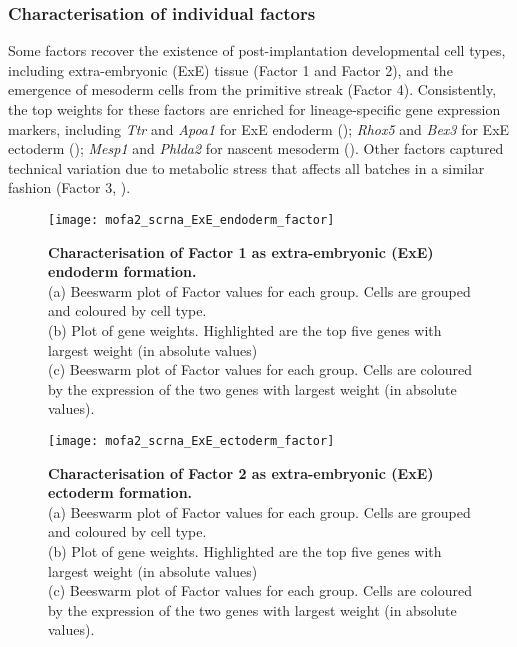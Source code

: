 \subsubsection{Characterisation of individual factors}

Some factors recover the existence of post-implantation developmental cell types, including extra-embryonic (ExE) tissue (Factor 1 and Factor 2), and the emergence of mesoderm cells from the primitive streak (Factor 4). Consistently, the top weights for these factors are enriched for lineage-specific gene expression markers, including \textit{Ttr} and \textit{Apoa1} for ExE endoderm (); \textit{Rhox5} and \textit{Bex3} for ExE ectoderm (); \textit{Mesp1} and \textit{Phlda2} for nascent mesoderm (). Other factors captured technical variation due to metabolic stress that affects all batches in a similar fashion (Factor 3, ).

\begin{figure}[H]
	\centering
	\texttt{[image: mofa2\_scrna\_ExE\_endoderm\_factor]}
	\caption[]{
	\textbf{Characterisation of Factor 1 as extra-embryonic (ExE) endoderm formation.} \\
	(a) Beeswarm plot of Factor values for each group. Cells are grouped and coloured by cell type. \\
	(b) Plot of gene weights. Highlighted are the top five genes with largest weight (in absolute values) \\
	(c) Beeswarm plot of Factor values for each group. Cells are coloured by the expression of the two genes with largest weight (in absolute values).
	}
	\label{fig:mofa2_scrna_ExE_endoderm_factor}
\end{figure}

\begin{figure}[H]
	\centering
	\texttt{[image: mofa2\_scrna\_ExE\_ectoderm\_factor]}
	\caption[]{
	\textbf{Characterisation of Factor 2 as extra-embryonic (ExE) ectoderm formation.} \\
	(a) Beeswarm plot of Factor values for each group. Cells are grouped and coloured by cell type. \\
	(b) Plot of gene weights. Highlighted are the top five genes with largest weight (in absolute values) \\
	(c) Beeswarm plot of Factor values for each group. Cells are coloured by the expression of the two genes with largest weight (in absolute values).
	}
	\label{fig:mofa2_scrna_ExE_ectoderm_factor}
\end{figure}

